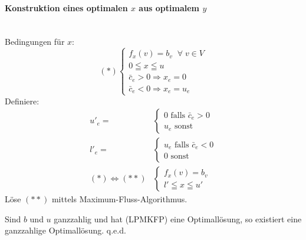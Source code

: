 \paragraph{Konstruktion eines optimalen $x$ aus optimalem $y$} \mbox{}\\
Bedingungen für $x$:
\[(\ast)\left\{\begin{array}{l}
f_{x}(v) = b_{v} \; \; \forall \; v \in V\\
0 \leqq x \leqq u\\
\bar{c}_{e} > 0 \Rightarrow x_{e} = 0\\
\bar{c}_{e} < 0 \Rightarrow x_{e} = u_{e}
\end{array} \right.
\]
Definiere:
\[\begin{array}{rl}
u'_{e} = & \left\{ \begin{array}{l} 0 \mbox{ falls }\bar{c}_e > 0\\
u_{e} \mbox{ sonst}\end{array}\right.\\
l'_{e} = & \left\{ \begin{array}{l} u_{e} \mbox{ falls } \bar{c}_{e} < 0\\
0 \mbox{ sonst}\end{array}\right.\\
(\ast) \Leftrightarrow (\ast\ast)& \left\{ \begin{array}{l} f_{x}(v) =
b_{v}\\ l' \leqq x \leqq u'\end{array} \right.
\end{array}\]
Löse $(\ast\ast)$ mittels Maximum-Fluss-Algorithmus.

\begin{satz}
Sind $b$ und $u$ ganzzahlig und hat (LPMKFP) eine Optimallösung, so
existiert eine ganzzahlige Optimallösung. q.e.d.
\end{satz}

